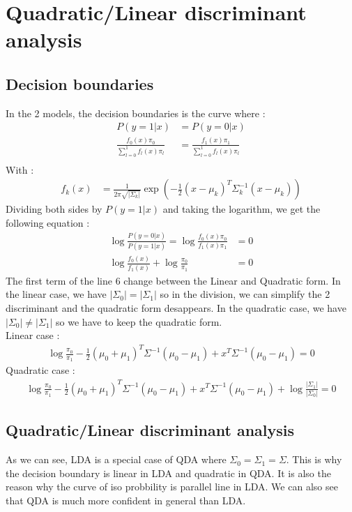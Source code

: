 \documentclass[12pt]{article}
\begin{document}
\section{Quadratic/Linear discriminant analysis}
\subsection{Decision boundaries}
In the 2 models, the decision boundaries is the curve where :
\begin{align}	
P(y=1|x) &= P(y=0|x)\\
\frac{f_0(x)\pi_0}{\sum^1_{l=0}f_l(x)\pi_l}&=\frac{f_1(x)\pi_1}{\sum^1_{l=0}f_l(x)\pi_l}\\
\end{align}
With : 
\begin{align}
	f_k(x) &= \frac{1}{2\pi\sqrt{|\Sigma_k|}}\exp\left(-\frac{1}{2}(x-\mu_k)^T\Sigma_k^{-1}(x-\mu_k)\right)
\end{align}
Dividing both sides by $P(y=1|x)$ and taking the logarithm, we get the following equation :
\begin{align}
	\log\frac{P(y=0|x)}{P(y=1|x)} = \log\frac{f_0(x)\pi_0}{f_1(x)\pi_1 }&=0\\
	\log\frac{f_0(x)}{f_1(x)} + \log\frac{\pi_0}{\pi_1}&= 0
\end{align}
The first term of the line 6 change between the Linear and Quadratic form. In the linear case, we have $|\Sigma_0|=|\Sigma_1|$ so in the division, we can simplify the 2 discriminant
and the quadratic form desappears. In the quadratic case, we have $|\Sigma_0|\neq|\Sigma_1|$ so we have to keep the quadratic form.\\
Linear case : 
\begin{align}
	\log\frac{\pi_0}{\pi_1} - \frac{1}{2}(\mu_0+\mu_1)^T\Sigma^{-1}(\mu_0-\mu_1) + x^T\Sigma^{-1}(\mu_0-\mu_1) = 0
\end{align}
Quadratic case : 
\begin{align}
	\log\frac{\pi_0}{\pi_1} - \frac{1}{2}(\mu_0+\mu_1)^T\Sigma^{-1}(\mu_0-\mu_1) + x^T\Sigma^{-1}(\mu_0-\mu_1) + \log\frac{|\Sigma_1|}{|\Sigma_0|} = 0
\end{align}
\subsection[]{Quadratic/Linear discriminant analysis}
As we can see, LDA is a special case of QDA where $\Sigma_0=\Sigma_1=\Sigma$. This is why the decision boundary is linear in LDA and quadratic in QDA.
It is also the reason why the curve of iso probbility is parallel line in LDA. We can also see that QDA is much more confident in general than LDA.
\end{document}
